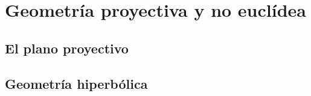\chapter{Geometría proyectiva y no euclídea} %
\label{cha:geometria_proyectiva_y_no_euclidea}

\section{El plano proyectivo} %
\label{sec:el_plano_proyectivo}

\section{Geometría hiperbólica} %
\label{sec:geometria_hiperbolica}

